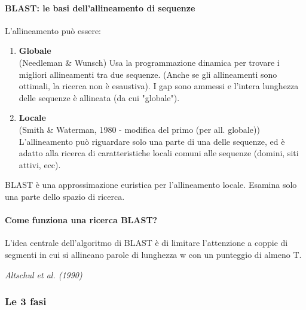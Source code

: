 \documentclass{article}
\begin{document}
\paragraph{BLAST: le basi dell'allineamento di sequenze}
L'allineamento può essere:
\begin{enumerate}
    \item \textbf{Globale}\\
    (Needleman \& Wunsch)
    \subitem Usa la programmazione dinamica per trovare i migliori
    allineamenti tra due sequenze.
    (Anche se gli allineamenti sono ottimali, la ricerca non è
    esaustiva). I gap sono ammessi e l'intera lunghezza delle
    sequenze è allineata (da cui "globale").
    \item \textbf{Locale}\\
    (Smith \& Waterman, 1980 -  modifica del primo (per all. globale))
    \subitem L'allineamento può riguardare solo una parte di una delle
    sequenze, ed è adatto alla ricerca di caratteristiche locali
    comuni alle sequenze (domini, siti attivi, ecc).
\end{enumerate}
BLAST è una approssimazione euristica per l'allineamento
locale. Esamina solo una parte dello spazio di ricerca.
\paragraph{Come funziona una ricerca BLAST?}
\epigraph{L'idea centrale dell'algoritmo di BLAST è di
limitare l'attenzione a coppie di segmenti in cui
si allineano parole di lunghezza w con un
punteggio di almeno T.}{\textit{Altschul et al. (1990)}}
\subsubsection{Le 3 fasi}
\end{document}
